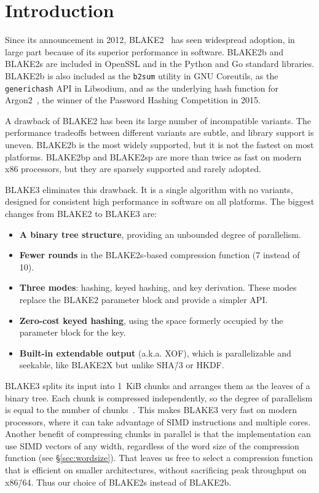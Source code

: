 \documentclass[11pt,notitlepage,a4paper]{article}
\begin{document}
\tableofcontents

\newpage

\section{Introduction}\label{sec:intro}

Since its announcement in 2012, BLAKE2~\cite{DBLP:conf/acns/AumassonNWW13} has
seen widespread adoption, in large part because of its superior performance in
software. BLAKE2b and BLAKE2s are included in OpenSSL and in the Python and Go
standard libraries. BLAKE2b is also included as the \texttt{b2sum} utility in
GNU Coreutils, as the \texttt{generichash} API in Libsodium, and as the
underlying hash function for Argon2~\cite{DBLP:conf/eurosp/BiryukovDK16}, the
winner of the Password Hashing Competition in 2015.

A drawback of BLAKE2 has been its large number of incompatible variants.
The performance tradeoffs between different variants are subtle, and
library support is uneven. BLAKE2b is the most widely supported, but it is not
the fastest on most platforms. BLAKE2bp and BLAKE2sp are more than twice as
fast on modern x86 processors, but they are sparsely supported and rarely
adopted.

BLAKE3 eliminates this drawback. It is a single algorithm with no variants,
designed for consistent high performance in software on all platforms. The
biggest changes from BLAKE2 to BLAKE3 are:

\begin{itemize}
    \item \textbf{A binary tree structure}, providing an unbounded
        degree of parallelism. 
    \item \textbf{Fewer rounds} in the BLAKE2s-based compression
    function (7 instead of 10).
    \item \textbf{Three modes}: hashing, keyed hashing, and key derivation.
        These modes replace the BLAKE2 parameter block and provide a simpler
        API.
    \item \textbf{Zero-cost keyed hashing}, using the space formerly occupied
        by the parameter block for the key.
    \item \textbf{Built-in extendable output} (a.k.a. XOF), which is
        parallelizable and seekable, like BLAKE2X but unlike SHA\=/3 or HKDF.
\end{itemize}

BLAKE3 splits its input into 1~KiB chunks and arranges them as the leaves of a
binary tree. Each chunk is compressed independently, so the degree of
parallelism is equal to the number of
chunks~\cite{DBLP:journals/tosc/AtighehchiB17,DBLP:journals/tc/AtighehchiR17}.
This makes BLAKE3 very fast on modern processors, where it can take advantage
of SIMD instructions and multiple cores. Another benefit of compressing chunks
in parallel is that the implementation can use SIMD vectors of any width,
regardless of the word size of the compression function (see
\S\ref{sec:wordsize}). That leaves us free to select a compression function
that is efficient on smaller architectures, without sacrificing peak throughput
on x86\=/64. Thus our choice of BLAKE2s instead of BLAKE2b.
\end{document}
